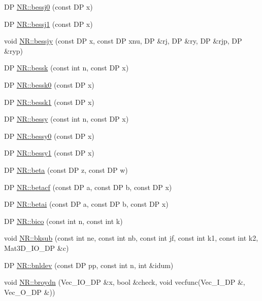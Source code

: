 \begin{DoxyCompactItemize}
\item 
DP \mbox{\hyperlink{namespaceNR_ac93cd7e7156598f76f6bb6de2833c776}{N\+R\+::bessj0}} (const DP x)
\item 
DP \mbox{\hyperlink{namespaceNR_a4115607a7ec9c7f9120010c2b95828bb}{N\+R\+::bessj1}} (const DP x)
\item 
void \mbox{\hyperlink{namespaceNR_a1d4131e07fae6eb514a9c163b52e0c04}{N\+R\+::bessjy}} (const DP x, const DP xnu, DP \&rj, DP \&ry, DP \&rjp, DP \&ryp)
\item 
DP \mbox{\hyperlink{namespaceNR_a40c43ba6abef517ca55293673c417584}{N\+R\+::bessk}} (const int n, const DP x)
\item 
DP \mbox{\hyperlink{namespaceNR_ad7a01f8ec189b154d56f9c82617d9991}{N\+R\+::bessk0}} (const DP x)
\item 
DP \mbox{\hyperlink{namespaceNR_a78b14863c0539fb70061775456e35d08}{N\+R\+::bessk1}} (const DP x)
\item 
DP \mbox{\hyperlink{namespaceNR_a470fb46ac0e710eae347c1137b1ebfb8}{N\+R\+::bessy}} (const int n, const DP x)
\item 
DP \mbox{\hyperlink{namespaceNR_ae31454cfbd454b6de0460f0e08ef933b}{N\+R\+::bessy0}} (const DP x)
\item 
DP \mbox{\hyperlink{namespaceNR_ae507795ea35c6716c6bf449c48af314f}{N\+R\+::bessy1}} (const DP x)
\item 
DP \mbox{\hyperlink{namespaceNR_a060c1496967431dfd707b603985a33b7}{N\+R\+::beta}} (const DP z, const DP w)
\item 
DP \mbox{\hyperlink{namespaceNR_a52e6dba4373484f23464637a58c46c39}{N\+R\+::betacf}} (const DP a, const DP b, const DP x)
\item 
DP \mbox{\hyperlink{namespaceNR_a462b09f1ae76391cfc50c8a032259b8a}{N\+R\+::betai}} (const DP a, const DP b, const DP x)
\item 
DP \mbox{\hyperlink{namespaceNR_a35306d0e713b54e50ad6bfdeca55d162}{N\+R\+::bico}} (const int n, const int k)
\item 
void \mbox{\hyperlink{namespaceNR_a16bf04bccb961bc7c1f0a1aa65d849ea}{N\+R\+::bksub}} (const int ne, const int nb, const int jf, const int k1, const int k2, Mat3\+D\+\_\+\+I\+O\+\_\+\+DP \&c)
\item 
DP \mbox{\hyperlink{namespaceNR_aa9a538f63c380caf2e72b8d6f4bdbe3e}{N\+R\+::bnldev}} (const DP pp, const int n, int \&idum)
\item 
void \mbox{\hyperlink{namespaceNR_a11b0d45adeba8de27502be58cc893210}{N\+R\+::broydn}} (Vec\+\_\+\+I\+O\+\_\+\+DP \&x, bool \&check, void vecfunc(Vec\+\_\+\+I\+\_\+\+DP \&, Vec\+\_\+\+O\+\_\+\+DP \&))

\end{DoxyCompactItemize}
